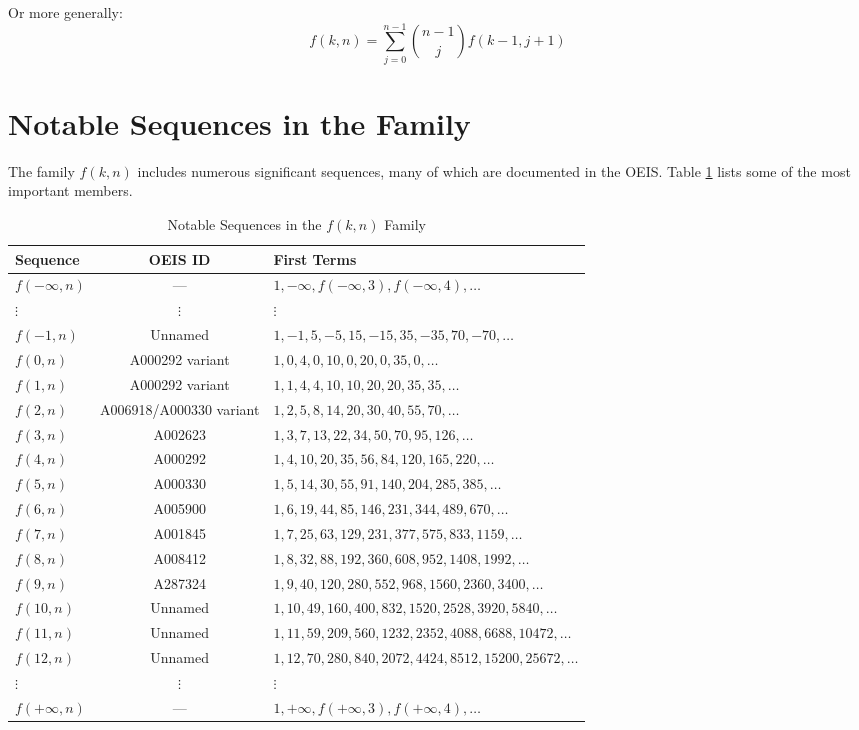 \documentclass[12pt,a4paper]{article}
\begin{document}
Or more generally:
\begin{equation}
f(k,n) = \sum_{j=0}^{n-1} \binom{n-1}{j} f(k-1,j+1)
\end{equation}

\section{Notable Sequences in the Family}

The family $f(k,n)$ includes numerous significant sequences, many of which are documented in the OEIS. Table \ref{tab:sequences} lists some of the most important members.

\begin{table}[H]
\centering
\caption{Notable Sequences in the $f(k,n)$ Family}
\label{tab:sequences}
\begin{tabular}{lcl}
\toprule
\textbf{Sequence} & \textbf{OEIS ID} & \textbf{First Terms} \\
\midrule
$f(-\infty,n)$ & --- & $1, -\infty, f(-\infty,3), f(-\infty,4), \ldots$ \\
$\vdots$ & $\vdots$ & $\vdots$ \\
$f(-1,n)$ & Unnamed & $1, -1, 5, -5, 15, -15, 35, -35, 70, -70, \ldots$ \\
$f(0,n)$ & A000292 variant & $1, 0, 4, 0, 10, 0, 20, 0, 35, 0, \ldots$ \\
$f(1,n)$ & A000292 variant & $1, 1, 4, 4, 10, 10, 20, 20, 35, 35, \ldots$ \\
$f(2,n)$ & A006918/A000330 variant & $1, 2, 5, 8, 14, 20, 30, 40, 55, 70, \ldots$ \\
$f(3,n)$ & A002623 & $1, 3, 7, 13, 22, 34, 50, 70, 95, 126, \ldots$ \\
$f(4,n)$ & A000292 & $1, 4, 10, 20, 35, 56, 84, 120, 165, 220, \ldots$ \\
$f(5,n)$ & A000330 & $1, 5, 14, 30, 55, 91, 140, 204, 285, 385, \ldots$ \\
$f(6,n)$ & A005900 & $1, 6, 19, 44, 85, 146, 231, 344, 489, 670, \ldots$ \\
$f(7,n)$ & A001845 & $1, 7, 25, 63, 129, 231, 377, 575, 833, 1159, \ldots$ \\
$f(8,n)$ & A008412 & $1, 8, 32, 88, 192, 360, 608, 952, 1408, 1992, \ldots$ \\
$f(9,n)$ & A287324 & $1, 9, 40, 120, 280, 552, 968, 1560, 2360, 3400, \ldots$ \\
$f(10,n)$ & Unnamed & $1, 10, 49, 160, 400, 832, 1520, 2528, 3920, 5840, \ldots$ \\
$f(11,n)$ & Unnamed & $1, 11, 59, 209, 560, 1232, 2352, 4088, 6688, 10472, \ldots$ \\
$f(12,n)$ & Unnamed & $1, 12, 70, 280, 840, 2072, 4424, 8512, 15200, 25672, \ldots$ \\
$\vdots$ & $\vdots$ & $\vdots$ \\
$f(+\infty,n)$ & --- & $1, +\infty, f(+\infty,3), f(+\infty,4), \ldots$ \\
\bottomrule
\end{tabular}
\end{table}
\end{document}
